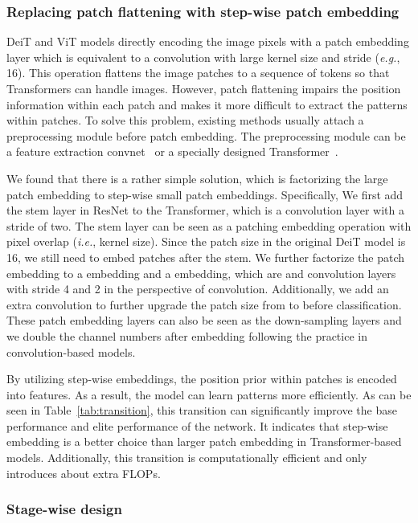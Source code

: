 \documentclass[10pt,twocolumn,letterpaper]{article}
\begin{document}
\subsubsection{Replacing patch flattening with step-wise patch embedding}
\label{methodology:transition:flattening}

DeiT and ViT models directly encoding the image pixels with a patch embedding layer which is equivalent to a convolution with large kernel size and stride (\textit{e.g.}, 16). This operation flattens the image patches to a sequence of tokens so that Transformers can handle images. However, patch flattening impairs the position information within each patch and makes it more difficult to extract the patterns within patches. To solve this problem, existing methods usually attach a preprocessing module before patch embedding. The preprocessing module can be a feature extraction convnet~\cite{dosovitskiy2020image} or a specially designed Transformer~\cite{yuan2021tokens}.

We found that there is a rather simple solution, which is factorizing the large patch embedding to step-wise small patch embeddings. Specifically, We first add the stem layer in ResNet to the Transformer, which is a  convolution layer with a stride of two. The stem layer can be seen as a  patching embedding operation with pixel overlap (\textit{i.e.},  kernel size). Since the patch size in the original DeiT model is 16, we still need to embed  patches after the stem. We further factorize the  patch embedding to a  embedding and a  embedding, which are  and  convolution layers with stride 4 and 2 in the perspective of convolution. Additionally, we add an extra  convolution to further upgrade the patch size from  to  before classification. These patch embedding layers can also be seen as the down-sampling layers and we double the channel numbers after embedding following the practice in convolution-based models.

By utilizing step-wise embeddings, the position prior within patches is encoded into features. As a result, the model can learn patterns more efficiently. As can be seen in Table~\ref{tab:transition}, this transition can significantly improve the base performance and elite performance of the network. It indicates that step-wise embedding is a better choice than larger patch embedding in Transformer-based models. Additionally, this transition is computationally efficient and only introduces about  extra FLOPs.

\subsubsection{Stage-wise design}
\label{methodology:transition:stage}
\end{document}
